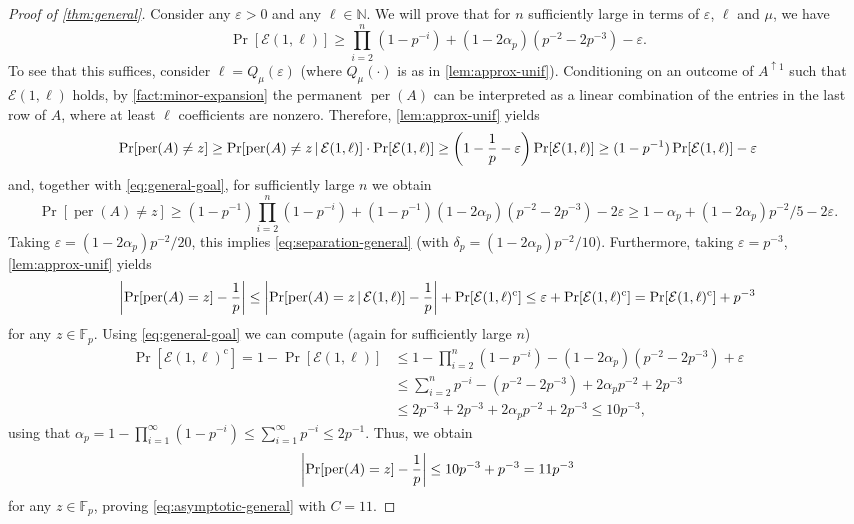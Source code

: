 \documentclass[10pt,reqno]{amsart}
\let\originalleft\left
\let\originalright\right
\renewcommand{\left}{\mathopen{}\mathclose\bgroup\originalleft}
\renewcommand{\right}{\aftergroup\egroup\originalright}
\numberwithin{equation}{section}
\theoremstyle{remark}
\newcommand{\mb}{\mathbb}
\newcommand{\mc}{\mathcal}
\newcommand{\on}{\operatorname}
\newcommand{\eps}{\varepsilon}
\begin{document}
\begin{proof}[Proof of \cref{thm:general}]
Consider any $\varepsilon>0$ and any $\ell\in \mb N$. We will prove that for $n$ sufficiently large in terms of $\eps$, $\ell$ and $\mu$, we have
\begin{equation}\Pr[\mc E(1,\ell)]\ge \prod_{i=2}^n(1-p^{-i})+(1-2\alpha_p)(p^{-2}-2p^{-3})-\varepsilon.\label{eq:general-goal}\end{equation}
To see that this suffices, consider $\ell=Q_\mu(\varepsilon)$ (where $Q_\mu(\cdot)$ is as in \cref{lem:approx-unif}). Conditioning on an outcome of $A^{\uparrow1}$ such that $\mc E(1,\ell)$ holds, by \cref{fact:minor-expansion} the permanent $\on{per}(A)$ can be interpreted as a linear combination of the entries in the last row of $A$, where at least $\ell$ coefficients are nonzero. Therefore, \cref{lem:approx-unif} yields
\[\Pr[\on{per}(A)\ne z]\ge \Pr[\on{per}(A)\ne z\,|\,\mc E(1,\ell)]\cdot \Pr[\mc E(1,\ell)]\ge \left(1-\frac1p-\varepsilon\right)\Pr[\mc E(1,\ell)]\ge (1-p^{-1})\Pr[\mc E(1,\ell)]-\varepsilon\]
and, together with \cref{eq:general-goal}, for sufficiently large $n$ we obtain
\[\Pr[\on{per}(A)\ne z]\ge (1-p^{-1})\prod_{i=2}^n(1-p^{-i})+(1-p^{-1})(1-2\alpha_p)(p^{-2}-2p^{-3})-2\varepsilon\ge 1-\alpha_p+(1-2\alpha_p)p^{-2}/5-2\eps.\]
Taking $\varepsilon=(1-2\alpha_p)p^{-2}/20$, this implies \cref{eq:separation-general} (with $\delta_p=(1-2\alpha_p)p^{-2}/10$). Furthermore, taking $\varepsilon=p^{-3}$, \cref{lem:approx-unif} yields
\[\left|\Pr[\on{per}(A)=z]-\frac 1p\right|\le \left|\Pr[\on{per}(A)=z\,|\,\mc E(1,\ell)]-\frac 1p\right|+\Pr[\mc E(1,\ell)^{\mathrm c}]\le \eps+\Pr[\mc E(1,\ell)^{\mathrm c}]=\Pr[\mc E(1,\ell)^{\mathrm c}]+p^{-3}\]
for any $z\in \mb F_p$. Using \cref{eq:general-goal} we can compute (again for sufficiently large $n$)
\begin{align*}
\Pr[\mc E(1,\ell)^{\mathrm c}]=1-\Pr[\mc E(1,\ell)]&\le 1-\prod_{i=2}^n(1-p^{-i})-(1-2\alpha_p)(p^{-2}-2p^{-3})+\varepsilon\\
&\le \sum_{i=2}^n p^{-i}-(p^{-2}-2p^{-3})+2\alpha_pp^{-2}+2p^{-3}\\
&\le 2p^{-3}+2p^{-3}+2\alpha_pp^{-2}+2p^{-3}\le 10p^{-3},
\end{align*}
using that $\alpha_p=1-\prod_{i=1}^\infty (1-p^{-i})\le \sum_{i=1}^\infty p^{-i}\le 2p^{-1}$. Thus, we obtain
\[\left|\Pr[\on{per}(A)=z]-\frac 1p\right|\le 10p^{-3}+p^{-3}=11p^{-3}\]
for any $z\in \mb F_p$, proving \cref{eq:asymptotic-general} with $C=11$.



\end{proof}
\end{document}
